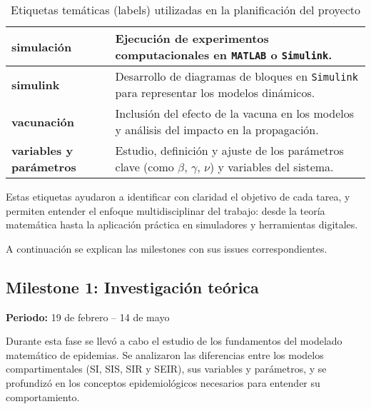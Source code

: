 \begin{table}[H]
\begin{tabular}{|p{4cm}|p{10cm}|}
    \hline
    \textbf{simulación} & Ejecución de experimentos computacionales en \texttt{MATLAB} o \texttt{Simulink}. \\
    \hline
    \textbf{simulink} & Desarrollo de diagramas de bloques en \texttt{Simulink} para representar los modelos dinámicos. \\
    \hline
    \textbf{vacunación} & Inclusión del efecto de la vacuna en los modelos y análisis del impacto en la propagación. \\
    \hline
    \textbf{variables y parámetros} & Estudio, definición y ajuste de los parámetros clave (como $\beta$, $\gamma$, $\nu$) y variables del sistema. \\
    \hline
    
    \end{tabular}

\caption{Etiquetas temáticas (labels) utilizadas en la planificación del proyecto}
\label{tab:etiquetas}
\end{table}
Estas etiquetas ayudaron a identificar con claridad el objetivo de cada tarea, y permiten entender el enfoque multidisciplinar del trabajo: desde la teoría matemática hasta la aplicación práctica en simuladores y herramientas digitales.



A continuación se explican las milestones con sus issues  correspondientes.
\subsection{Milestone 1: Investigación teórica}
\textbf{Periodo:} 19 de febrero – 14 de mayo

Durante esta fase se llevó a cabo el estudio de los fundamentos del modelado matemático de epidemias. Se analizaron las diferencias entre los modelos compartimentales (SI, SIS, SIR y SEIR), sus variables y parámetros, y se profundizó en los conceptos epidemiológicos necesarios para entender su comportamiento.

